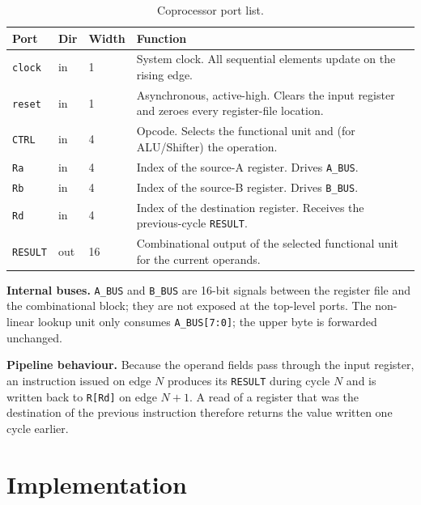 \documentclass[11pt,a4paper]{article}
\begin{document}
\begin{table}[H]
  \centering
  \caption{Coprocessor port list.}
  \label{tab:ports}
  \renewcommand{\arraystretch}{1.15}
  \begin{tabularx}{\linewidth}{@{}l l l X@{}}
    \toprule
    \textbf{Port} & \textbf{Dir} & \textbf{Width} & \textbf{Function} \\
    \midrule
    \texttt{clock}  & in  & 1  & System clock. All sequential elements update on the rising edge. \\
    \texttt{reset}  & in  & 1  & Asynchronous, active-high. Clears the input register and zeroes every register-file location. \\
    \texttt{CTRL}   & in  & 4  & Opcode. Selects the functional unit and (for ALU/Shifter) the operation. \\
    \texttt{Ra}     & in  & 4  & Index of the source-A register. Drives \texttt{A\_BUS}. \\
    \texttt{Rb}     & in  & 4  & Index of the source-B register. Drives \texttt{B\_BUS}. \\
    \texttt{Rd}     & in  & 4  & Index of the destination register. Receives the previous-cycle \texttt{RESULT}. \\
    \texttt{RESULT} & out & 16 & Combinational output of the selected functional unit for the current operands. \\
    \bottomrule
  \end{tabularx}
\end{table}

\noindent\textbf{Internal buses.} \texttt{A\_BUS} and \texttt{B\_BUS}
are 16-bit signals between the register file and the combinational
block; they are not exposed at the top-level ports. The non-linear
lookup unit only consumes \texttt{A\_BUS[7:0]}; the upper byte is
forwarded unchanged.

\noindent\textbf{Pipeline behaviour.} Because the operand fields pass
through the input register, an instruction issued on edge $N$ produces
its \texttt{RESULT} during cycle $N$ and is written back to
\texttt{R[Rd]} on edge $N+1$. A read of a register that was the
destination of the previous instruction therefore returns the value
written one cycle earlier.

\section{Implementation}
\end{document}
